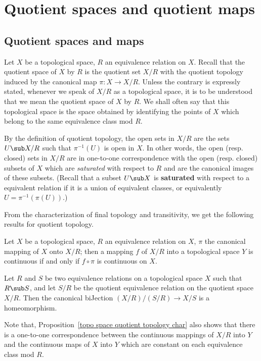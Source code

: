 \section{Quotient spaces and quotient maps}
\subsection{Quotient spaces and maps}
Let $X$ be a topological space, $R$ an equivalence relation on $X$. Recall that the quotient space of $X$ by $R$ is the quotient set $X/R$ with the quotient topology induced by the canonical map $\pi:X\to X/R$. Unless the contrary is expressly stated, whenever we speak of $X/R$ as a topological space, it is to be understood that we mean the quotient space of $X$ by $R$. We shall often say that this topological space is the space obtained by identifying the points of $X$ which belong to the same equivalence class mod $R$.\par
By the definition of quotient topology, the open sets in $X/R$ are the sets $U\sub X/R$ such that $\pi^{-1}(U)$ is open in $X$. In other words, the open (resp. closed) sets in $X/R$ are in one-to-one correspondence with the open (resp. closed) subsets of $X$ which are \textit{saturated} with respect to $R$ and are the canonical images of these subsets. (Recall that a subset $U\sub X$ is \textbf{saturated} with respect to a equivalent relation if it is a union of equivalent classes, or equivalently $U=\pi^{-1}(\pi(U))$.)\par
From the characterization of final topology and transitivity, we get the following results for quotient topology.
\begin{proposition}\label{topo space quotient topology char}
Let $X$ be a topological space, $R$ an equivalence relation on $X$, $\pi$ the canonical mapping of $X$ onto $X/R$; then a mapping $f$ of $X/R$ into a topological space $Y$ is continuous if and only if $f\circ\pi$ is continuous on $X$.
\end{proposition}
\begin{proposition}\label{topo space quotient topology transitivity}
Let $R$ and $S$ be two equivalence relations on a topological space $X$ such that $R\sub S$, and let $S/R$ be the quotient equivalence relation on the quotient space $X/R$. Then the canonical biJection $(X/R)/(S/R)\to X/S$ is a homeomorphism.
\end{proposition}
Note that, Proposition~\ref{topo space quotient topology char} also shows that there is a one-to-one correspondence between the continuous mappings of $X/R$ into $Y$ and the continuous maps of $X$ into $Y$ which are constant on each equivalence class mod $R$.
